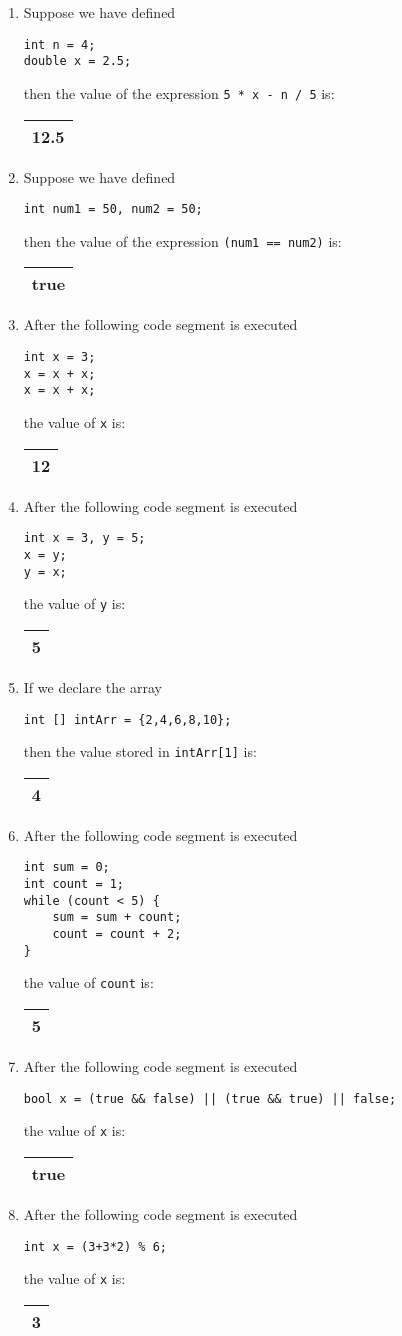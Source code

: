 \documentclass[12pt]{report}
\newcommand{\Ans}[1]{\hfill {\Huge\begin{tabular}{|c|} \hline \hfill #1\\ \hline \end{tabular}} }
\begin{document}
\renewcommand{\labelenumi}{\alph{enumi}.}
\begin{enumerate}
\item Suppose we have defined
\begin{verbatim}
int n = 4;
double x = 2.5;
\end{verbatim}
then the value of the expression \texttt{5 * x - n / 5} is: \Ans{12.5}

\item Suppose we have defined
\begin{verbatim}
int num1 = 50, num2 = 50;
\end{verbatim}
then the value of the expression \texttt{(num1 == num2)} is: \Ans{true}

\item After the following code segment is executed
\begin{verbatim}
int x = 3; 
x = x + x; 
x = x + x;
\end{verbatim}
the value of \texttt{x} is: \Ans{12}

\item After the following code segment is executed
\begin{verbatim}
int x = 3, y = 5;
x = y;
y = x;
\end{verbatim}
the value of \texttt{y} is: \Ans{5}

\item If we declare the array
\begin{verbatim}
int [] intArr = {2,4,6,8,10};
\end{verbatim}
then the value stored in \texttt{intArr[1]} is: \Ans{4}

\item After the following code segment is executed
\begin{verbatim}
int sum = 0;
int count = 1;
while (count < 5) {
    sum = sum + count;
    count = count + 2;
}
\end{verbatim}
the value of \texttt{count} is: \Ans{5}

\item After the following code segment is executed
\begin{verbatim}
bool x = (true && false) || (true && true) || false;
\end{verbatim}
the value of \texttt{x} is: \Ans{true}

\item After the following code segment is executed
\begin{verbatim}
int x = (3+3*2) % 6;
\end{verbatim}
the value of \texttt{x} is: \Ans{3}


\end{enumerate}
\end{document}
